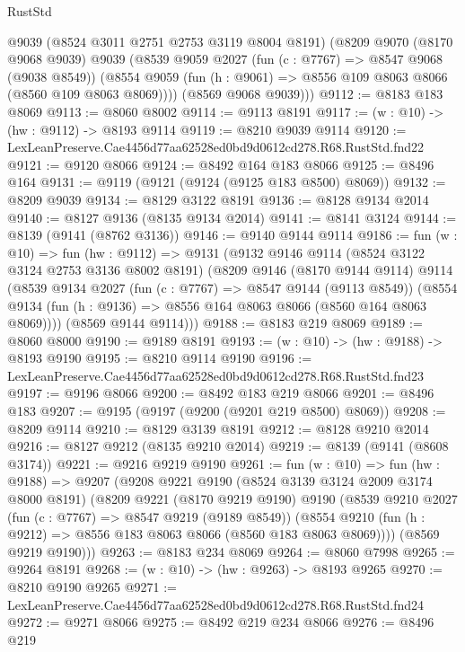 \begin{lexlean}{RustStd}
\begin{coremodule}
      @9039
      (@8524 @3011 @2751 @2753 @3119 @8004 @8191)
      (@8209
        @9070
        (@8170 @9068 @9039)
        @9039
        (@8539
          @9059
          @2027
          (fun (c : @7767) => @8547 @9068 (@9038 @8549))
          (@8554 @9059 (fun (h : @9061) => @8556 @109 @8063 @8066 (@8560 @109 @8063 @8069))))
        (@8569 @9068 @9039)))
@9112 := @8183 @183 @8069
@9113 := @8060 @8002
@9114 := @9113 @8191
@9117 := (w : @10) -> (hw : @9112) -> @8193 @9114
@9119 := @8210 @9039 @9114
@9120 := LexLeanPreserve.Cae4456d77aa62528ed0bd9d0612cd278.R68.RustStd.fnd22
@9121 := @9120 @8066
@9124 := @8492 @164 @183 @8066
@9125 := @8496 @164
@9131 := @9119 (@9121 (@9124 (@9125 @183 @8500) @8069))
@9132 := @8209 @9039
@9134 := @8129 @3122 @8191
@9136 := @8128 @9134 @2014
@9140 := @8127 @9136 (@8135 @9134 @2014)
@9141 := @8141 @3124
@9144 := @8139 (@9141 (@8762 @3136))
@9146 := @9140 @9144 @9114
@9186 := fun (w : @10) =>
  fun (hw : @9112) =>
  @9131
    (@9132
      @9146
      @9114
      (@8524 @3122 @3124 @2753 @3136 @8002 @8191)
      (@8209
        @9146
        (@8170 @9144 @9114)
        @9114
        (@8539
          @9134
          @2027
          (fun (c : @7767) => @8547 @9144 (@9113 @8549))
          (@8554 @9134 (fun (h : @9136) => @8556 @164 @8063 @8066 (@8560 @164 @8063 @8069))))
        (@8569 @9144 @9114)))
@9188 := @8183 @219 @8069
@9189 := @8060 @8000
@9190 := @9189 @8191
@9193 := (w : @10) -> (hw : @9188) -> @8193 @9190
@9195 := @8210 @9114 @9190
@9196 := LexLeanPreserve.Cae4456d77aa62528ed0bd9d0612cd278.R68.RustStd.fnd23
@9197 := @9196 @8066
@9200 := @8492 @183 @219 @8066
@9201 := @8496 @183
@9207 := @9195 (@9197 (@9200 (@9201 @219 @8500) @8069))
@9208 := @8209 @9114
@9210 := @8129 @3139 @8191
@9212 := @8128 @9210 @2014
@9216 := @8127 @9212 (@8135 @9210 @2014)
@9219 := @8139 (@9141 (@8608 @3174))
@9221 := @9216 @9219 @9190
@9261 := fun (w : @10) =>
  fun (hw : @9188) =>
  @9207
    (@9208
      @9221
      @9190
      (@8524 @3139 @3124 @2009 @3174 @8000 @8191)
      (@8209
        @9221
        (@8170 @9219 @9190)
        @9190
        (@8539
          @9210
          @2027
          (fun (c : @7767) => @8547 @9219 (@9189 @8549))
          (@8554 @9210 (fun (h : @9212) => @8556 @183 @8063 @8066 (@8560 @183 @8063 @8069))))
        (@8569 @9219 @9190)))
@9263 := @8183 @234 @8069
@9264 := @8060 @7998
@9265 := @9264 @8191
@9268 := (w : @10) -> (hw : @9263) -> @8193 @9265
@9270 := @8210 @9190 @9265
@9271 := LexLeanPreserve.Cae4456d77aa62528ed0bd9d0612cd278.R68.RustStd.fnd24
@9272 := @9271 @8066
@9275 := @8492 @219 @234 @8066
@9276 := @8496 @219

\end{coremodule}
\end{lexlean}

